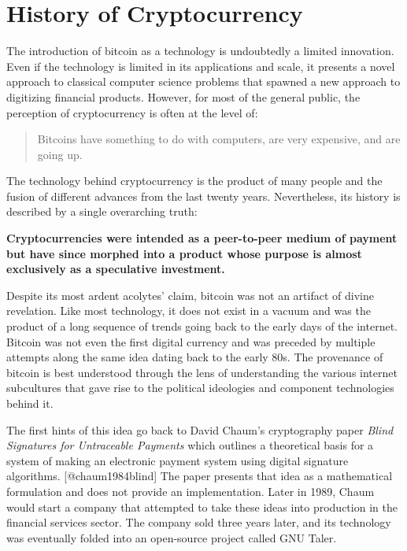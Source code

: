 \chapter{History of Cryptocurrency}


The introduction of bitcoin as a technology is undoubtedly a limited innovation.
Even if the technology is limited in its applications and scale, it presents a
novel approach to classical computer science problems that spawned a new
approach to digitizing financial products. However, for most of the general
public, the perception of cryptocurrency is often at the level of:

\begin{quote}
Bitcoins have something to do with computers, are very expensive, and are going up.
\end{quote}

The technology behind cryptocurrency is the product of many people and the
fusion of different advances from the last twenty years. Nevertheless, its
history is described by a single overarching truth:

\begin{infobox}
 \textbf{
    Cryptocurrencies were intended as a peer-to-peer medium of payment but have since morphed into a product whose purpose is almost exclusively as a speculative investment.
  }
\end{infobox}

Despite its most ardent acolytes' claim, bitcoin was not an artifact of divine
revelation. Like most technology, it does not exist in a vacuum and was the
product of a long sequence of trends going back to the early days of the
internet. Bitcoin was not even the first digital currency and was preceded by
multiple attempts along the same idea dating back to the early 80s. The
provenance of bitcoin is best understood through the lens of understanding the
various internet subcultures that gave rise to the political ideologies and
component technologies behind it.

The first hints of this idea go back to David Chaum's cryptography paper
\textit{Blind Signatures for Untraceable Payments} which outlines a theoretical
basis for a system of making an electronic payment system using digital
signature algorithms. [@chaum1984blind] The paper presents that idea as a
mathematical formulation and does not provide an implementation. Later in 1989,
Chaum would start a company that attempted to take these ideas into production
in the financial services sector. The company sold three years later, and its
technology was eventually folded into an open-source project called GNU Taler.

